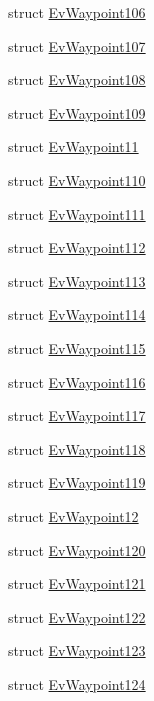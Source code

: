 \begin{DoxyCompactItemize}
\item 
struct \hyperlink{structcl__move__base__z_1_1EvWaypoint106}{Ev\+Waypoint106}
\item 
struct \hyperlink{structcl__move__base__z_1_1EvWaypoint107}{Ev\+Waypoint107}
\item 
struct \hyperlink{structcl__move__base__z_1_1EvWaypoint108}{Ev\+Waypoint108}
\item 
struct \hyperlink{structcl__move__base__z_1_1EvWaypoint109}{Ev\+Waypoint109}
\item 
struct \hyperlink{structcl__move__base__z_1_1EvWaypoint11}{Ev\+Waypoint11}
\item 
struct \hyperlink{structcl__move__base__z_1_1EvWaypoint110}{Ev\+Waypoint110}
\item 
struct \hyperlink{structcl__move__base__z_1_1EvWaypoint111}{Ev\+Waypoint111}
\item 
struct \hyperlink{structcl__move__base__z_1_1EvWaypoint112}{Ev\+Waypoint112}
\item 
struct \hyperlink{structcl__move__base__z_1_1EvWaypoint113}{Ev\+Waypoint113}
\item 
struct \hyperlink{structcl__move__base__z_1_1EvWaypoint114}{Ev\+Waypoint114}
\item 
struct \hyperlink{structcl__move__base__z_1_1EvWaypoint115}{Ev\+Waypoint115}
\item 
struct \hyperlink{structcl__move__base__z_1_1EvWaypoint116}{Ev\+Waypoint116}
\item 
struct \hyperlink{structcl__move__base__z_1_1EvWaypoint117}{Ev\+Waypoint117}
\item 
struct \hyperlink{structcl__move__base__z_1_1EvWaypoint118}{Ev\+Waypoint118}
\item 
struct \hyperlink{structcl__move__base__z_1_1EvWaypoint119}{Ev\+Waypoint119}
\item 
struct \hyperlink{structcl__move__base__z_1_1EvWaypoint12}{Ev\+Waypoint12}
\item 
struct \hyperlink{structcl__move__base__z_1_1EvWaypoint120}{Ev\+Waypoint120}
\item 
struct \hyperlink{structcl__move__base__z_1_1EvWaypoint121}{Ev\+Waypoint121}
\item 
struct \hyperlink{structcl__move__base__z_1_1EvWaypoint122}{Ev\+Waypoint122}
\item 
struct \hyperlink{structcl__move__base__z_1_1EvWaypoint123}{Ev\+Waypoint123}
\item 
struct \hyperlink{structcl__move__base__z_1_1EvWaypoint124}{Ev\+Waypoint124}

\end{DoxyCompactItemize}
